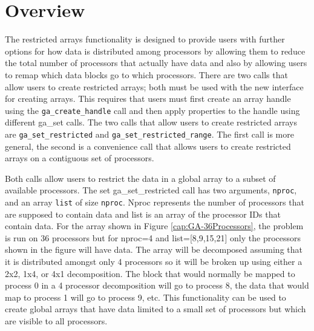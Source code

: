 
\section{Overview}

The restricted arrays functionality is designed to provide users with
further options for how data is distributed among processors by allowing
them to reduce the total number of processors that actually have data
and also by allowing users to remap which data blocks go to which
processors. There are two calls that allow users to create restricted
arrays; both must be used with the new interface for creating arrays.
This requires that users must first create an array handle using the
\texttt{ga\_create\_handle} call and then apply properties to the
handle using different ga\_set calls. The two calls that allow users
to create restricted arrays are \texttt{ga\_set\_restricted} and \texttt{ga\_set\_restricted\_range}.
The first call is more general, the second is a convenience call that
allows users to create restricted arrays on a contiguous set of processors. 

Both calls allow users to restrict the data in a global array to a
subset of available processors. The set ga\_set\_restricted call has
two arguments, \texttt{nproc}, and an array \texttt{list} of size
\texttt{nproc}. Nproc represents the number of processors that are
supposed to contain data and list is an array of the processor IDs
that contain data. For the array shown in Figure \ref{cap:GA-36Processors},
the problem is run on 36 processors but for nproc=4 and list={[}8,9,15,21{]}
only the processors shown in the figure will have data. The array
will be decomposed assuming that it is distributed amongst only 4
processors so it will be broken up using either a 2x2, 1x4, or 4x1
decomposition. The block that would normally be mapped to process
0 in a 4 processor decomposition will go to process 8, the data that
would map to process 1 will go to process 9, etc. This functionality
can be used to create global arrays that have data limited to a small
set of processors but which are visible to all processors. 

